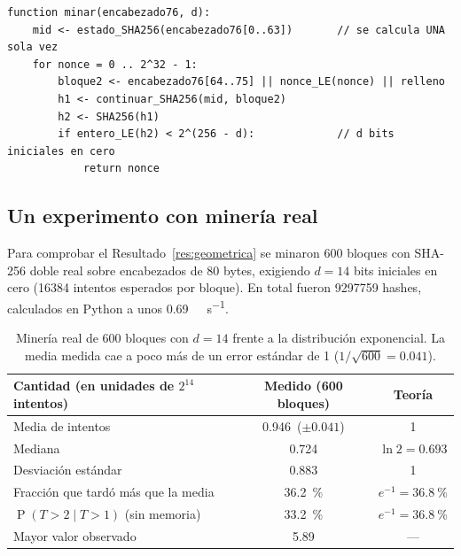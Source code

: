 \documentclass[11pt,a4paper]{article}
\newcommand{\Prob}[1]{\operatorname{P}\!\left(#1\right)}
\newcommand{\webhint}[1]{}
\begin{document}
\begin{lstlisting}[language=pseudo]
function minar(encabezado76, d):
    mid <- estado_SHA256(encabezado76[0..63])       // se calcula UNA sola vez
    for nonce = 0 .. 2^32 - 1:
        bloque2 <- encabezado76[64..75] || nonce_LE(nonce) || relleno
        h1 <- continuar_SHA256(mid, bloque2)
        h2 <- SHA256(h1)
        if entero_LE(h2) < 2^(256 - d):             // d bits iniciales en cero
            return nonce
\end{lstlisting}

\subsection{Un experimento con minería real}

Para comprobar el Resultado~\ref{res:geometrica} se minaron \num{600} bloques con SHA-256 doble real sobre encabezados de 80 bytes, exigiendo $d=14$ bits iniciales en cero (\num{16384} intentos esperados por bloque). En total fueron \num{9297759} hashes, calculados en Python a unos \SI{0.69}{\mega\hash\per\second}.

\begin{table}[tbp]
\centering
\webhint{table; id=tab-mineria-real; kind=comparison; data=data/summary.json#mineria_real}
\small
\renewcommand{\arraystretch}{1.2}
\begin{tabular}{@{}lcc@{}}
\toprule
\textbf{Cantidad (en unidades de $2^{14}$ intentos)} & \textbf{Medido (600 bloques)} & \textbf{Teoría}\\
\midrule
Media de intentos & \num{0.946}\ ($\pm 0.041$) & 1\\
Mediana & \num{0.724} & $\ln 2=0.693$\\
Desviación estándar & \num{0.883} & 1\\
Fracción que tardó más que la media & \SI{36.2}{\percent} & $e^{-1}=\SI{36.8}{\percent}$\\
$\Prob{T>2\mid T>1}$ (sin memoria) & \SI{33.2}{\percent} & $e^{-1}=\SI{36.8}{\percent}$\\
Mayor valor observado & \num{5.89} & ---\\
\bottomrule
\end{tabular}
\caption{Minería real de 600 bloques con $d=14$ frente a la distribución exponencial. La media medida cae a poco más de un error estándar de 1 ($1/\sqrt{600}=0.041$).}\label{tab:mineria-real}
\end{table}
\end{document}
